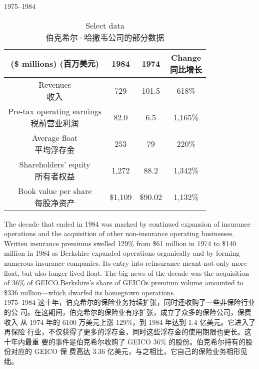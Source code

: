 \begin{section}{1975--1984}

\begin{table}[!htbp]
  \centering
  \begin{center}
    \begin{tabular}{cccc}
      \toprule
      \makecell[c]{(\$ millions) \\ (百万美元)} & 1984 & 1974 & \makecell[c]{Change \\ 同比增长} \\
      \midrule
      \makecell[c]{Revenues \\ 收入} & 729 & 101.5 & 618\% \\
      \makecell[c]{Pre-tax operating earnings \\ 税前营业利润} & 82.0 & 6.5 & 1,165\% \\
      \makecell[c]{Average float \\ 平均浮存金} & 253 & 79 & 220\% \\
      \makecell[c]{Shareholders' equity \\ 所有者权益} & 1,272 & 88.2 & 1,342\% \\
      \makecell[c]{Book value per share \\ 每股净资产} & \$1,109 & \$90.02 & 1,132\% \\
      \bottomrule
    \end{tabular}
    \caption{Select data \\ 伯克希尔·哈撒韦公司的部分数据}
  \end{center}
\end{table}

\begin{verseparallel}
  {
    The decade that ended in 1984 was marked by continued expansion of insurance
    operations and the acquisition of other non-insurance operating businesses.
    Written insurance premiums swelled 129\% from \$61 million in 1974 to \$140
    million in 1984 as Berkshire expanded operations organically and by forming
    numerous insurance companies. Its entry into reinsurance meant not only more
    float, but also longer-lived float. The big news of the decade was the
    acquisition of 36\% of GEICO.\@ Berkshire's share of GEICOs premium volume
    amounted to \$336 million—which dwarfed its homegrown operations. \\
  }
  {
    1975--1984 这十年，伯克希尔的保险业务持续扩张，同时还收购了一些非保险行业的公
    司。在这期间，伯克希尔的保险业有序扩张，成立了众多的保险公司，保费收入
    从 1974 年的 6100 万美元上涨 129\%，到 1984 年达到 1.4 亿美元。它进入了再保险
    行业，不仅获得了更多的浮存金，同时这些浮存金的使用期限也更长。这十年内最重
    要的事件是伯克希尔收购了 GEICO 36\% 的股份。伯克希尔持有的股份对应的 GEICO 保
    费高达 3.36 亿美元，与之相比，它自己的保险业务相形见绌。
  }
\end{verseparallel}


\end{section}
